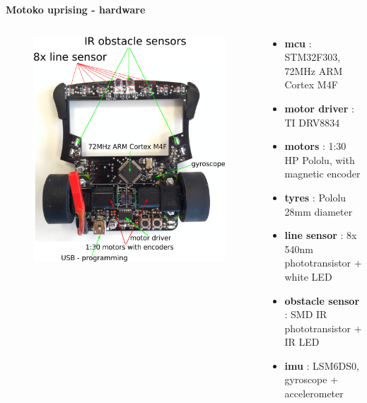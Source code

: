 \documentclass[xcolor=dvipsnames]{beamer}
\begin{document}
\begin{frame}{\bf Motoko uprising - hardware}


\begin{columns}

    \begin{column}{0.5\textwidth}

        \begin{figure}
            \includegraphics[scale=0.3]{../../diagrams/motoko_uprising_hw.png}
        \end{figure}

    \end{column}


    \begin{column}{0.5\textwidth}  %
    {\small
        \begin{itemize}
            \item {\bf mcu}  : STM32F303, 72MHz ARM Cortex M4F
            \item {\bf motor driver} : TI DRV8834
            \item {\bf motors} : 1:30 HP Pololu, with magnetic encoder
            \item {\bf tyres} : Pololu 28mm diameter
            \item {\bf line sensor} : 8x 540nm phototransistor + white LED
            \item {\bf obstacle sensor} : SMD IR phototransistor + IR LED
            \item {\bf imu} : LSM6DS0, gyroscope + accelerometer
        \end{itemize}
    }
    \end{column}

\end{columns}


\end{frame}
\end{document}
